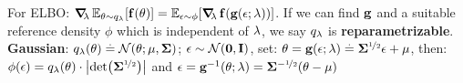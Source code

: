 For ELBO: $\grad_\vlambda \E[\vtheta \sim q_\vlambda]{\vf(\vtheta)} = \E[\vepsilon \sim \phi]{\grad_\vlambda \vf(\vg(\vepsilon; \vlambda))}$. If we can find $\mathbf{g}$ and a suitable reference density $\phi$ which is independent of $\mathbf{\lambda}$, we say $q_{\mathbf{\lambda}}$ is \textbf{reparametrizable}. \\
\textbf{Gaussian}: $q_\vlambda(\vtheta) \defeq \N[\vtheta]{\vmu}{\mSigma}$; ${\vepsilon \sim \SN}$, set: $\mathbf{\theta} = \mathbf{g}(\mathbf{\epsilon}; \mathbf{\lambda}) \overset{.}{=} \mathbf{\Sigma}^{\nicefrac{1}{2}} \mathbf{\epsilon} + \mathbf{\mu}$, then: $\phi(\vepsilon) = q_\vlambda(\vtheta) \cdot \abs{\det{\msqrt{\mSigma}}}$ and $\mathbf{\epsilon} = \mathbf{g}^{-1}(\mathbf{\theta}; \mathbf{\lambda}) = \mathbf{\Sigma}^{-\nicefrac{1}{2}}(\mathbf{\theta} - \mathbf{\mu})$
